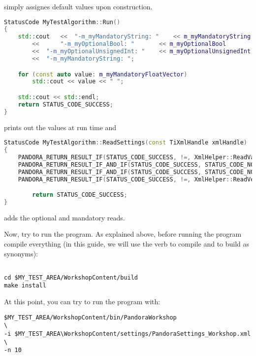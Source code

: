 simply assignes default values upon construction.

\begin{lstlisting}[language=C++, caption=Python example]
StatusCode MyTestAlgorithm::Run()
{
    std::cout	<<	"-m_myMandatoryString: " 	<< m_myMandatoryString 		<< std::endl
		<<      "-m_myOptionalBool: "	 	<< m_myOptionalBool    		<< std::endl
		<<	"-m_myOptionalUnsignedInt: "	<< m_myOptionalUnsignedInt	<< std::endl
		<<	"-m_myMandatoryString: ";	

    for (const auto value: m_myMandatoryFloatVector)
        std::cout << value << " ";    

    std::cout << std::endl;
    return STATUS_CODE_SUCCESS;
}
\end{lstlisting}

prints out the values at run time and

\begin{lstlisting}[language=C++, caption=Python example]
StatusCode MyTestAlgorithm::ReadSettings(const TiXmlHandle xmlHandle)
{
	PANDORA_RETURN_RESULT_IF(STATUS_CODE_SUCCESS, !=, XmlHelper::ReadValue(xmlHandle,"MyMandatoryString", m_myMandatoryString));
	PANDORA_RETURN_RESULT_IF_AND_IF(STATUS_CODE_SUCCESS, STATUS_CODE_NOT_FOUND, !=, XmlHelper::ReadValue(xmlHandle,"MyOptionalBool", m_myOptionalBool));
	PANDORA_RETURN_RESULT_IF_AND_IF(STATUS_CODE_SUCCESS, STATUS_CODE_NOT_FOUND, !=, XmlHelper::ReadValue(xmlHandle,"MyOptionalUnsignedInt", m_myOptionalUnsignedInt));
	PANDORA_RETURN_RESULT_IF(STATUS_CODE_SUCCESS, !=, XmlHelper::ReadVectorOfValues(xmlHandle,"MyMandatoryFloatVector", m_myMandatoryFloatVector));

        return STATUS_CODE_SUCCESS;
}
\end{lstlisting}
adds the optional and mandatory reads.

Now, try to run the program. As explained above, before running the program compile everything (in this guide, we will use the verb to compile and to build as synonyms):


\begin{verbatim}

cd $MY_TEST_AREA/WorkshopContent/build
make install

\end{verbatim}



At this point, you can try to run the program with:

\begin{lstlisting}[label=launch]
$MY_TEST_AREA/WorkshopContent/bin/PandoraWorkshop                      \
-i $MY_TEST_AREA\WorkshopContent/settings/PandoraSettings_Workshop.xml \
-n 10
\end{lstlisting}

